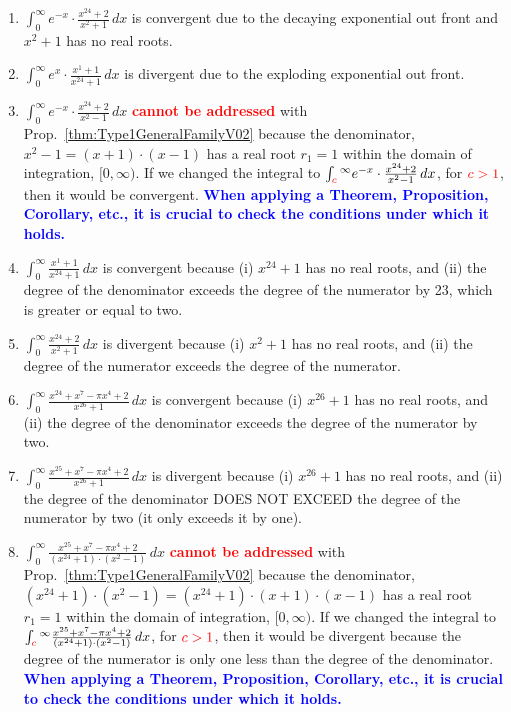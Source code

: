 \begin{enumerate}
\renewcommand{\labelenumi}{(\alph{enumi})}
\setlength{\itemsep}{.2cm}
    \item  $\int_0^\infty e^{-x} \cdot \frac{x^{24} + 2}{x^2 + 1} \, dx$ is convergent due to the decaying exponential out front and ${x^2 + 1}$ has no real roots.

    \item  $\int_0^\infty e^{x} \cdot \frac{x^1 + 1}{x^{24} + 1} \, dx$ is divergent due to the exploding exponential out front.

    \item  $\int_0^\infty e^{-x} \cdot \frac{x^{24} + 2}{x^2 - 1} \, dx$ \textcolor{red}{\bf cannot be addressed} with Prop.~\ref{thm:Type1GeneralFamilyV02} because the denominator, $x^2 - 1 = (x+1)\cdot (x-1)$  has a real root $r_1=1$ within the domain of integration, $[0, \infty)$. If we changed the integral to $\int_{\color{red} c}^\infty e^{-x} \cdot \frac{x^{24} + 2}{x^2 - 1} \, dx$, for ${\color{red} c>1}$, then it would be convergent. \textcolor{blue}{\bf When applying a Theorem, Proposition, Corollary, etc., it is crucial to check the conditions under which it holds.}

    \item  $\int_0^\infty  \frac{x^1 + 1}{x^{24} + 1} \, dx$ is convergent because (i) $x^{24} + 1$ has no real roots, and (ii) the degree of the denominator exceeds the degree of the numerator by 23, which is greater or equal to two.

    \item  $\int_0^\infty  \frac{x^{24} + 2}{x^2 + 1} \, dx$ is divergent because (i) $x^{2} + 1$ has no real roots, and (ii) the degree of the numerator exceeds the degree of the numerator.

     \item  $\int_0^\infty  \frac{x^{24} + x^7 - \pi x^4  + 2}{x^{26} + 1} \, dx$ is convergent because (i) $x^{26} + 1$ has no real roots, and (ii) the degree of the denominator exceeds the degree of the numerator by two.

     \item  $\int_0^\infty  \frac{x^{25} + x^7 - \pi x^4  + 2}{x^{26} + 1} \, dx$ is divergent because (i) $x^{26} + 1$ has no real roots, and (ii) the degree of the denominator DOES NOT EXCEED the degree of the numerator by two (it only exceeds it by one).

      \item  $\int_0^\infty  \frac{x^{25} + x^7 - \pi x^4 + 2}{(x^{24} + 1)\cdot (x^2 - 1)} \, dx$ \textcolor{red}{\bf cannot be addressed} with Prop.~\ref{thm:Type1GeneralFamilyV02} because the denominator, $(x^{24} + 1)\cdot (x^2 - 1) = (x^{24} + 1) \cdot (x+1)\cdot (x-1)$  has a real root $r_1=1$ within the domain of integration, $[0, \infty)$. If we changed the integral to $\int_{\color{red} c}^\infty \frac{x^{25} + x^7 - \pi x^4 + 2}{(x^{24} + 1) \cdot (x^2 - 1)}  \, dx$, for ${\color{red} c > 1}$, then it would be divergent because the degree of the numerator is only one less than the degree of the denominator. \textcolor{blue}{\bf When applying a Theorem, Proposition, Corollary, etc., it is crucial to check the conditions under which it holds.}

\end{enumerate}

